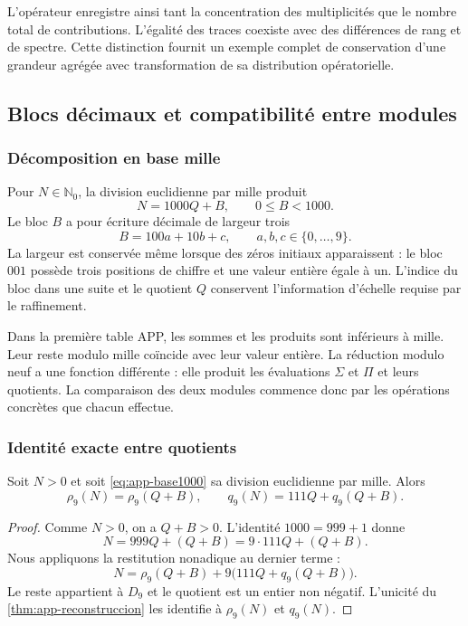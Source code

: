 L'opérateur enregistre ainsi tant la concentration des multiplicités que le nombre total de contributions. L'égalité des traces coexiste avec des différences de rang et de spectre. Cette distinction fournit un exemple complet de conservation d'une grandeur agrégée avec transformation de sa distribution opératorielle.

\subsection{Blocs décimaux et compatibilité entre modules}
\label{sec:app-base-mil}

\subsubsection{Décomposition en base mille}

Pour $N\in\mathbb N_0$, la division euclidienne par mille produit
\begin{equation}
 N=1000Q+B,\qquad 0\leq B<1000.
 \label{eq:app-base1000}
\end{equation}
Le bloc $B$ a pour écriture décimale de largeur trois
\[
 B=100a+10b+c,\qquad a,b,c\in\{0,\ldots,9\}.
\]
La largeur est conservée même lorsque des zéros initiaux apparaissent : le bloc $001$ possède trois positions de chiffre et une valeur entière égale à un. L'indice du bloc dans une suite et le quotient $Q$ conservent l'information d'échelle requise par le raffinement.

Dans la première table APP, les sommes et les produits sont inférieurs à mille. Leur reste modulo mille coïncide avec leur valeur entière. La réduction modulo neuf a une fonction différente : elle produit les évaluations $\Sigma$ et $\Pi$ et leurs quotients. La comparaison des deux modules commence donc par les opérations concrètes que chacun effectue.

\subsubsection{Identité exacte entre quotients}

\begin{bloqueindivisible}
\begin{teorema}
\label{thm:app-compatibilidad-mil}
Soit $N>0$ et soit \eqref{eq:app-base1000} sa division euclidienne par mille. Alors
\begin{equation}
 \rho_9(N)=\rho_9(Q+B),\qquad
 q_9(N)=111Q+q_9(Q+B).
 \label{eq:app-cross-module}
\end{equation}
\end{teorema}

\begin{proof}
Comme $N>0$, on a $Q+B>0$. L'identité $1000=999+1$ donne
\[
 N=999Q+(Q+B)=9\cdot111Q+(Q+B).
\]
Nous appliquons la restitution nonadique au dernier terme :
\[
 N=\rho_9(Q+B)+9\bigl(111Q+q_9(Q+B)\bigr).
\]
Le reste appartient à $D_9$ et le quotient est un entier non négatif. L'unicité du \cref{thm:app-reconstruccion} les identifie à $\rho_9(N)$ et $q_9(N)$.
\end{proof}
\end{bloqueindivisible}

